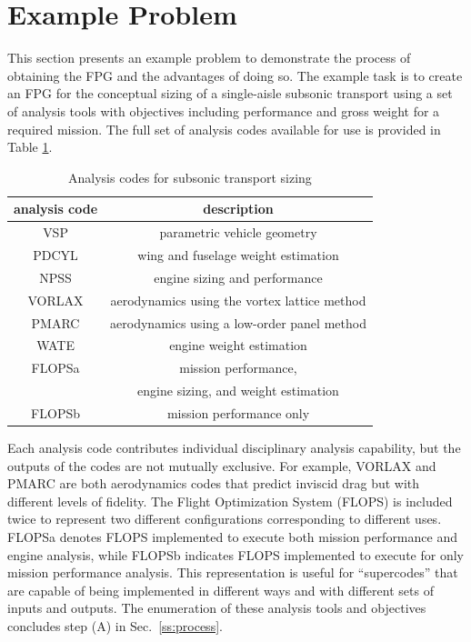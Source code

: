\section{Example Problem}
	\label{s:example problem}
	This section presents an example problem to demonstrate the process of obtaining the FPG and the advantages of doing so. 
The example task is to create an FPG for the conceptual sizing of a single-aisle subsonic transport using a set of analysis tools with objectives including performance and gross weight for a required mission. 
	The full set of analysis codes available for use is provided in Table \ref{t:analysis codes}.
	\begin{table}[htbp]
	  \centering
	  \caption{Analysis codes for subsonic transport sizing}
		\begin{tabular}{cc}
		\toprule
		analysis code & description \\
		\midrule
		VSP   & parametric vehicle geometry \\
		PDCYL & wing and fuselage weight estimation \\
		NPSS  & engine sizing and performance \\
		VORLAX & aerodynamics using the vortex lattice method \\
		PMARC & aerodynamics using a low-order panel method \\
		WATE  & engine weight estimation \\
		FLOPSa & mission performance, \\
		  & engine sizing, and weight estimation \\
		FLOPSb & mission performance only \\
		\bottomrule
		\end{tabular}%
	  \label{t:analysis codes}%
	\end{table}%
	Each analysis code contributes individual disciplinary analysis capability, but the outputs of the codes are not mutually exclusive. 
	For example, VORLAX and PMARC are both aerodynamics codes that predict inviscid drag but with different levels of fidelity. 
	The Flight Optimization System (FLOPS) is included twice to represent two different configurations corresponding to different uses. 
	FLOPSa denotes FLOPS implemented to execute both mission performance and engine analysis, while FLOPSb indicates  FLOPS implemented to execute for only mission performance analysis. 
	This representation is useful for ``supercodes'' that are capable of being implemented in different ways and with different sets of inputs and outputs.
The enumeration of these analysis tools and objectives concludes step (A) in Sec.~\ref{ss:process}.

